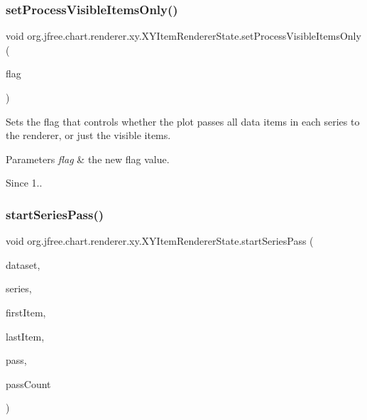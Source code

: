 \subsubsection{\texorpdfstring{set\+Process\+Visible\+Items\+Only()}{setProcessVisibleItemsOnly()}}
{\footnotesize\ttfamily void org.\+jfree.\+chart.\+renderer.\+xy.\+X\+Y\+Item\+Renderer\+State.\+set\+Process\+Visible\+Items\+Only (\begin{DoxyParamCaption}\item[{boolean}]{flag }\end{DoxyParamCaption})}

Sets the flag that controls whether the plot passes all data items in each series to the renderer, or just the visible items.


\begin{DoxyParams}{Parameters}
{\em flag} & the new flag value.\\
\hline
\end{DoxyParams}
\begin{DoxySince}{Since}
1.. 
\end{DoxySince}
\mbox{\label{classorg_1_1jfree_1_1chart_1_1renderer_1_1xy_1_1_x_y_item_renderer_state_af81402a6d5fd64c706dec147748bb8d7}} 
\subsubsection{\texorpdfstring{start\+Series\+Pass()}{startSeriesPass()}}
{\footnotesize\ttfamily void org.\+jfree.\+chart.\+renderer.\+xy.\+X\+Y\+Item\+Renderer\+State.\+start\+Series\+Pass (\begin{DoxyParamCaption}\item[{\mbox{\hyperlink{interfaceorg_1_1jfree_1_1data_1_1xy_1_1_x_y_dataset}{X\+Y\+Dataset}}}]{dataset,  }\item[{int}]{series,  }\item[{int}]{first\+Item,  }\item[{int}]{last\+Item,  }\item[{int}]{pass,  }\item[{int}]{pass\+Count }\end{DoxyParamCaption})}


